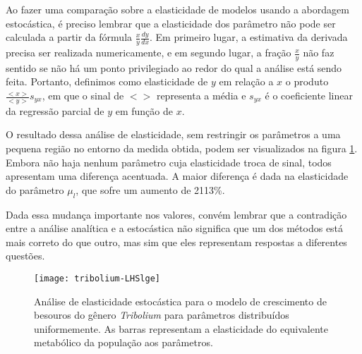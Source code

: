 \documentclass[12pt,a4paper]{article}
\begin{document}
Ao fazer uma compara\c c\~ao sobre a elasticidade de modelos usando
a abordagem estoc\'astica, \'e preciso lembrar que a elasticidade
dos par\^ametro n\~ao pode ser calculada a partir da 
f\'ormula $\frac{x}{y}\frac{dy}{dx}$. Em primeiro lugar, a estimativa
da derivada precisa ser realizada numericamente, e em segundo lugar, 
a fra\c c\~ao $\frac{x}{y}$ n\~ao faz sentido se n\~ao h\'a um ponto
privilegiado ao redor do qual a an\'alise est\'a sendo feita. Portanto,
definimos como elasticidade de $y$ em rela\c c\~ao a $x$ o produto
$\frac{<x>}{<y>}s_{yx}$, em que o sinal de $<>$ representa 
a m\'edia e $s_{yx}$ \'e o coeficiente linear da regress\~ao parcial
de $y$ em fun\c c\~ao de $x$.

O resultado dessa an\'alise de elasticidade, sem restringir os par\^ametros
a uma pequena regi\~ao no entorno da medida obtida, podem ser visualizados
na figura \ref{LHSlge}. Embora n\~ao haja nenhum par\^ametro cuja elasticidade
troca de sinal, todos apresentam uma diferen\c ca acentuada. A maior
diferen\c ca \'e dada na elasticidade do par\^ametro $\mu_l$, que 
sofre um aumento de 2113\%. 

Dada essa mudan\c ca importante nos valores, conv\'em lembrar que a
contradi\c c\~ao entre a an\'alise anal\'itica e a estoc\'astica
n\~ao significa que um dos m\'etodos est\'a mais correto do que outro, mas
sim que eles representam respostas a diferentes quest\~oes.

\begin{figure}
\texttt{[image: tribolium-LHSlge]}
	\caption{An\'alise de elasticidade estoc\'astica para o modelo de
	crescimento de besouros do g\^enero {\em Tribolium} para par\^ametros
	distribu\'idos uniformemente. As barras
	representam a elasticidade do equivalente metab\'olico da 
	popula\c c\~ao aos par\^ametros.}
	\label{LHSlge}
\end{figure}
\end{document}
